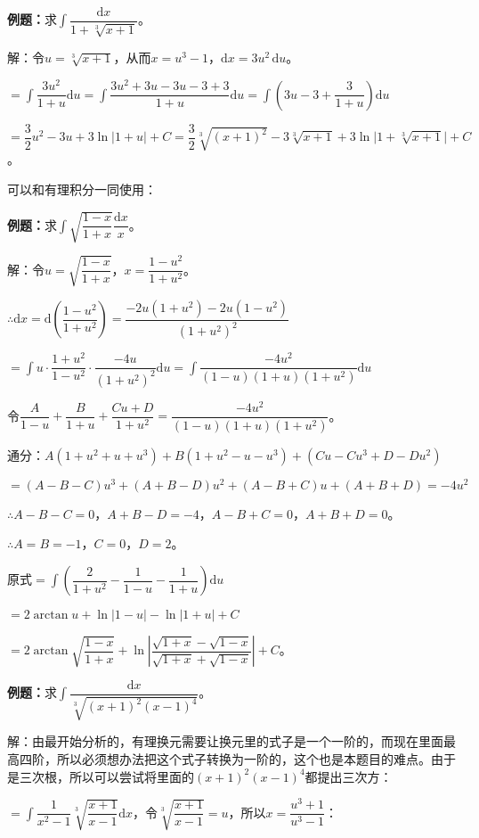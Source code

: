 \documentclass[UTF8, 12pt]{ctexart}
\begin{document}
\textbf{例题：}求$\displaystyle{\int\dfrac{\textrm{d}x}{1+\sqrt[3]{x+1}}}$。

解：令$u=\sqrt[3]{x+1}$，从而$x=u^3-1$，$\textrm{d}x=3u^2\,\textrm{d}u$。

$=\displaystyle{\int\dfrac{3u^2}{1+u}\textrm{d}u=\int\dfrac{3u^2+3u-3u-3+3}{1+u}\textrm{d}u=\int\left(3u-3+\dfrac{3}{1+u}\right)\textrm{d}u}$

$=\dfrac{3}{2}u^2-3u+3\ln\vert1+u\vert+C=\dfrac{3}{2}\sqrt[3]{(x+1)^2}-3\sqrt[3]{x+1}+3\ln\vert1+\sqrt[3]{x+1}\vert+C$。

可以和有理积分一同使用：\medskip

\textbf{例题：}求$\displaystyle{\int\sqrt{\dfrac{1-x}{1+x}}\dfrac{\textrm{d}x}{x}}$。\medskip

解：令$u=\sqrt{\dfrac{1-x}{1+x}}$，$x=\dfrac{1-u^2}{1+u^2}$。

$\therefore\textrm{d}x=\textrm{d}\left(\dfrac{1-u^2}{1+u^2}\right)=\dfrac{-2u(1+u^2)-2u(1-u^2)}{(1+u^2)^2}$

$=\displaystyle{\int u\cdot\dfrac{1+u^2}{1-u^2}\cdot\dfrac{-4u}{(1+u^2)^2}\textrm{d}u=\int\dfrac{-4u^2}{(1-u)(1+u)(1+u^2)}\textrm{d}u}$

令$\dfrac{A}{1-u}+\dfrac{B}{1+u}+\dfrac{Cu+D}{1+u^2}=\dfrac{-4u^2}{(1-u)(1+u)(1+u^2)}$。

通分：$A(1+u^2+u+u^3)+B(1+u^2-u-u^3)+(Cu-Cu^3+D-Du^2)$

$=(A-B-C)u^3+(A+B-D)u^2+(A-B+C)u+(A+B+D)=-4u^2$

$\therefore A-B-C=0$，$A+B-D=-4$，$A-B+C=0$，$A+B+D=0$。

$\therefore A=B=-1$，$C=0$，$D=2$。

原式$=\displaystyle{\int\left(\dfrac{2}{1+u^2}-\dfrac{1}{1-u}-\dfrac{1}{1+u}\right)\textrm{d}u}$

$=2\arctan u+\ln\vert1-u\vert-\ln\vert1+u\vert+C$

$=2\arctan\sqrt{\dfrac{1-x}{1+x}}+\ln\left\vert\dfrac{\sqrt{1+x}-\sqrt{1-x}}{\sqrt{1+x}+\sqrt{1-x}}\right\vert+C$。

\textbf{例题：}求$\displaystyle{\int\dfrac{\textrm{d}x}{\sqrt[3]{(x+1)^2(x-1)^4}}}$。

解：由最开始分析的，有理换元需要让换元里的式子是一个一阶的，而现在里面最高四阶，所以必须想办法把这个式子转换为一阶的，这个也是本题目的难点。由于是三次根，所以可以尝试将里面的$(x+1)^2(x-1)^4$都提出三次方：

$=\displaystyle{\int\dfrac{1}{x^2-1}\sqrt[3]{\dfrac{x+1}{x-1}}\textrm{d}x}$，令$\sqrt[3]{\dfrac{x+1}{x-1}}=u$，所以$x=\dfrac{u^3+1}{u^3-1}$：
\end{document}
